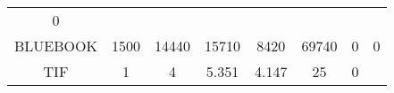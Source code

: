\documentclass[]{article}
\begin{document}
\begin{longtable}[]{@{}cccccccc@{}}
\begin{minipage}[t]{0.14\columnwidth}
0\strut
\end{minipage}\tabularnewline
\begin{minipage}[t]{0.11\columnwidth}\centering\strut
BLUEBOOK\strut
\end{minipage} & \begin{minipage}[t]{0.07\columnwidth}\centering\strut
1500\strut
\end{minipage} & \begin{minipage}[t]{0.09\columnwidth}\centering\strut
14440\strut
\end{minipage} & \begin{minipage}[t]{0.09\columnwidth}\centering\strut
15710\strut
\end{minipage} & \begin{minipage}[t]{0.09\columnwidth}\centering\strut
8420\strut
\end{minipage} & \begin{minipage}[t]{0.09\columnwidth}\centering\strut
69740\strut
\end{minipage} & \begin{minipage}[t]{0.13\columnwidth}\centering\strut
0\strut
\end{minipage} & \begin{minipage}[t]{0.14\columnwidth}\centering\strut
0\strut
\end{minipage}\tabularnewline
\begin{minipage}[t]{0.11\columnwidth}\centering\strut
TIF\strut
\end{minipage} & \begin{minipage}[t]{0.07\columnwidth}\centering\strut
1\strut
\end{minipage} & \begin{minipage}[t]{0.09\columnwidth}\centering\strut
4\strut
\end{minipage} & \begin{minipage}[t]{0.09\columnwidth}\centering\strut
5.351\strut
\end{minipage} & \begin{minipage}[t]{0.09\columnwidth}\centering\strut
4.147\strut
\end{minipage} & \begin{minipage}[t]{0.09\columnwidth}\centering\strut
25\strut
\end{minipage} & \begin{minipage}[t]{0.13\columnwidth}\centering\strut
0\strut
\end{minipage} & \begin{minipage}[t]{0.14\columnwidth}\centering\strut

\end{minipage}
\end{longtable}
\end{document}
